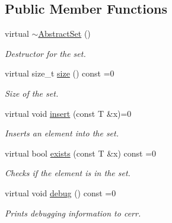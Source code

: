 \subsection*{Public Member Functions}
\begin{DoxyCompactItemize}
\item 
\hypertarget{class_abstract_set_a8306cfe855dc733b25a91ae030fe815a}{virtual \hyperlink{class_abstract_set_a8306cfe855dc733b25a91ae030fe815a}{$\sim$\-Abstract\-Set} ()}\label{class_abstract_set_a8306cfe855dc733b25a91ae030fe815a}

\begin{DoxyCompactList}\small\item\em Destructor for the set. \end{DoxyCompactList}\item 
\hypertarget{class_abstract_set_ad7e6f3001d69f7c12e1890585aabf76b}{virtual size\-\_\-t \hyperlink{class_abstract_set_ad7e6f3001d69f7c12e1890585aabf76b}{size} () const =0}\label{class_abstract_set_ad7e6f3001d69f7c12e1890585aabf76b}

\begin{DoxyCompactList}\small\item\em Size of the set. \end{DoxyCompactList}\item 
\hypertarget{class_abstract_set_a12afe4c5cea823491fdfca02cc644bf3}{virtual void \hyperlink{class_abstract_set_a12afe4c5cea823491fdfca02cc644bf3}{insert} (const T \&x)=0}\label{class_abstract_set_a12afe4c5cea823491fdfca02cc644bf3}

\begin{DoxyCompactList}\small\item\em Inserts an element into the set. \end{DoxyCompactList}\item 
\hypertarget{class_abstract_set_a2b9d1b3662218ab3ba98fd3db085852f}{virtual bool \hyperlink{class_abstract_set_a2b9d1b3662218ab3ba98fd3db085852f}{exists} (const T \&x) const =0}\label{class_abstract_set_a2b9d1b3662218ab3ba98fd3db085852f}

\begin{DoxyCompactList}\small\item\em Checks if the element is in the set. \end{DoxyCompactList}\item 
\hypertarget{class_abstract_set_a60770781af640d8060abac15f14e3d2e}{virtual void \hyperlink{class_abstract_set_a60770781af640d8060abac15f14e3d2e}{debug} () const =0}\label{class_abstract_set_a60770781af640d8060abac15f14e3d2e}

\begin{DoxyCompactList}\small\item\em Prints debugging information to cerr. \end{DoxyCompactList}\end{DoxyCompactItemize}


